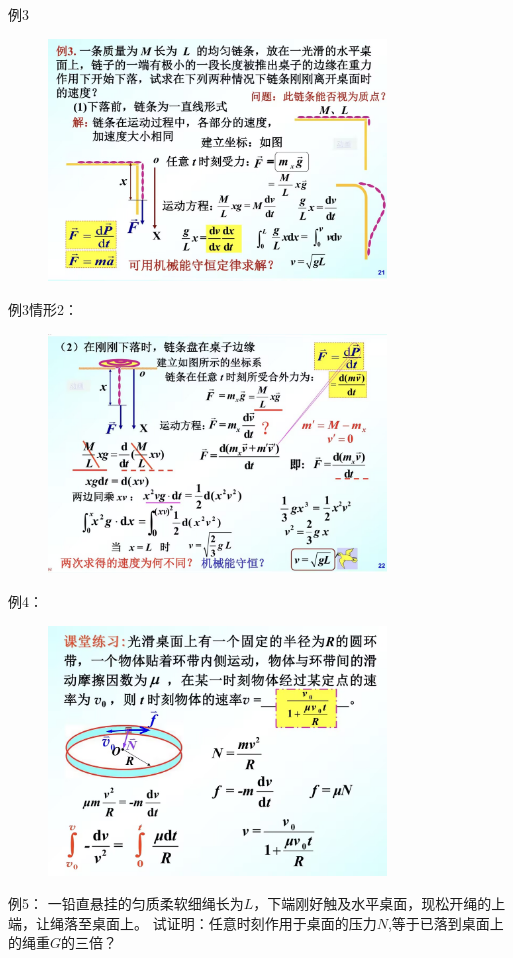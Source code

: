 \documentclass[10pt,a4paper]{article}
\begin{document}
例3
\begin{figure}[h]
    \centering
    \includegraphics[width=0.8\textwidth]{eg3-1.jpg}
    \end{figure}
\newpage
例3情形2：
\begin{figure}[h]
    \centering
    \includegraphics[width=0.8\textwidth]{eg3-2.jpg}
    \end{figure}

例4：
\begin{figure}[h]
    \centering
    \includegraphics[width=0.8\textwidth]{eg4.jpg}
    \end{figure}
\newpage
例5：
一铅直悬挂的匀质柔软细绳长为$L$，下端刚好触及水平桌面，现松开绳的上端，让绳落至桌面上。
试证明：任意时刻作用于桌面的压力$N$,等于已落到桌面上的绳重$G$的三倍？
\end{document}
